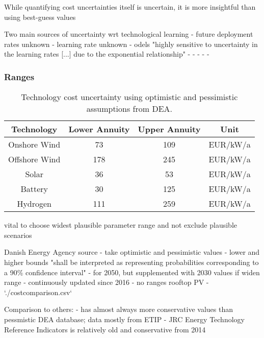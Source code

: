 While quantifying cost uncertainties itself is uncertain,
it is more insightful than using best-guess values \cite{fraiture_robustness_2020}

Two main sources of uncertainty wrt technological learning \cite{trondle_trade-offs_2020}
- future deployment rates unknown
- learning rate unknown
- odels "highly sensitive to uncertainty in the learning rates [...] due to the exponential relationship" \cite{mattsson_learning_2019}
- \cite{yeh_review_2012}
- \cite{heuberger_power_2017}
- \cite{gritsevskyi_modeling_2000}
- \cite{schmidt_projecting_2019}
- \cite{schmidt_future_2017}

\subsubsection{Ranges}

\begin{SCtable}
    \begin{small}
        \begin{tabular}{cccc}
            \toprule
            Technology & Lower Annuity & Upper Annuity & Unit  \\ \midrule
            Onshore Wind & 73 & 109 & EUR/kW/a \\
            Offshore Wind & 178 & 245 & EUR/kW/a \\ %
            Solar & 36 & 53 & EUR/kW/a \\
            Battery & 30 & 125 & EUR/kW/a \\
            Hydrogen & 111 & 259 & EUR/kW/a \\ \bottomrule
        \end{tabular}
    \end{small}
    \caption{Technology cost uncertainty using optimistic and pessimistic assumptions from DEA.}
\end{SCtable}   

vital to choose widest plausible parameter range and not exclude plausible scenarios \cite{moret_characterization_2017,mccollum_energy_2020}

Danish Energy Agency source
- take optimistic and pessimistic values
- lower and higher bounds "shall be interpreted as representing probabilities corresponding to a 90\% confidence interval"
- for 2050, but supplemented with 2030 values if widen range
- continuously updated since 2016
- no ranges rooftop PV
- `./costcomparison.csv`

Comparison to others:
- \cite{trondle_trade-offs_2020} has almost always more conservative values than pessmistic DEA database; data mostly from ETIP
- JRC Energy Technology Reference Indicators is relatively old and conservative from 2014

